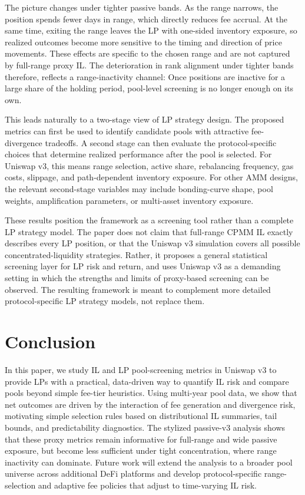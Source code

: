 \documentclass[anonymous]{lipics-v2021}
\begin{document}
{The picture changes under tighter passive bands. 
As the range narrows, the position spends fewer days in range, which directly reduces fee accrual. 
At the same time, exiting the range leaves the LP with one-sided inventory exposure, so realized outcomes become more sensitive to the timing and direction of price movements. 
These effects are specific to the chosen range and are not captured by full-range proxy IL. 
The deterioration in rank alignment under tighter bands therefore, reflects a range-inactivity channel: Once positions are inactive for a large share of the holding period, pool-level screening is no longer enough on its own.

This leads naturally to a two-stage view of LP strategy design. 
The proposed metrics can first be used to identify candidate pools with attractive fee-divergence tradeoffs. 
A second stage can then evaluate the protocol-specific choices that determine realized performance after the pool is selected. 
For Uniswap v3, this means range selection, active share, rebalancing frequency, gas costs, slippage, and path-dependent inventory exposure. 
For other AMM designs, the relevant second-stage variables may include bonding-curve shape, pool weights, amplification parameters, or multi-asset inventory exposure.

These results position the framework as a screening tool rather than a complete LP strategy model. 
The paper does not claim that full-range CPMM IL exactly describes every LP position, or that the Uniswap v3 simulation covers all possible concentrated-liquidity strategies. 
Rather, it proposes a general statistical screening layer for LP risk and return, and uses Uniswap v3 as a demanding setting in which the strengths and limits of proxy-based screening can be observed. 
The resulting framework is meant to complement more detailed protocol-specific LP strategy models, not replace them.

\section{Conclusion}
\label{sec:conclusion}
In this paper, we study IL and LP pool-screening metrics in Uniswap v3 to provide LPs with a practical, data-driven way to quantify IL risk and compare pools beyond simple fee-tier heuristics. 
Using multi-year pool data, we show that net outcomes are driven by the interaction of fee generation and divergence risk, motivating simple selection rules based on distributional IL summaries, tail bounds, and predictability diagnostics. 
The stylized passive-v3 analysis shows that these proxy metrics remain informative for full-range and wide passive exposure, but become less sufficient under tight concentration, where range inactivity can dominate.
Future work will extend the analysis to a broader pool universe across additional DeFi platforms and develop protocol-specific range-selection and adaptive fee policies that adjust to time-varying IL risk.

}
\end{document}
